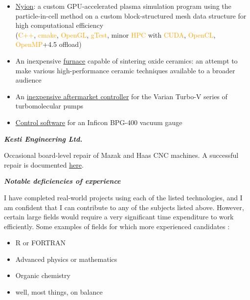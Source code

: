\documentclass[fleqn,11pt]{article}
\newcommand{\ressection}[1]{\textbf{{\Large \textit{#1}}}\xrfill[0.1ex]{0.6pt}}
\newcommand{\sk}[1]{\textcolor{orange}{#1}}
\newcommand{\itemoptions}{\setlength{\itemindent}{-10pt} \setlength\itemsep{-1em}}
\begin{document}
\begin{itemize}\itemoptions
	\item \href{https://github.com/0xDBFB7/Nyion}{Nyion}: a custom GPU-accelerated plasma simulation program using the particle-in-cell method on a custom block-structured mesh data structure for high computational efficiency\\
	(\sk{C++}, \sk{cmake}, \sk{OpenGL}, \sk{gTest}, minor \sk{HPC} with \sk{CUDA}, \sk{OpenCL}, \sk{OpenMP}+4.5 offload)
	\item An inexpensive \href{https://0xdbfb7.com/furnace.html}{furnace} capable of sintering oxide ceramics: an attempt to make various high-performance ceramic techniques available to a broader audience%
	\item An \href{https://github.com/0xDBFB7/varian-turbo-controller}{inexpensive aftermarket controller} for the Varian Turbo-V series of turbomolecular pumps 
	\item \href{https://gist.github.com/0xDBFB7/7bd7048c6639270e6f291a2673903184}{Control software} for an Inficon BPG-400 vacuum gauge
\end{itemize}








\ressection{Kesti Engineering Ltd.}

Occasional board-level repair of Mazak and Haas CNC machines. A successful repair is documented \href{https://0xdbfb7.com/meldas.html}{here}.

\ressection{Notable deficiencies of experience}

I have completed real-world projects using each of the listed technologies, and I am confident that I can contribute to any of the subjects listed above. However, certain large fields would require a very significant time expenditure to work efficiently. Some examples of fields for which more experienced candidates :

\begin{itemize}\itemoptions
	\item R or FORTRAN
	\item Advanced physics or mathematics
	\item Organic chemistry
	\item well, most things, on balance
\end{itemize}
\end{document}
